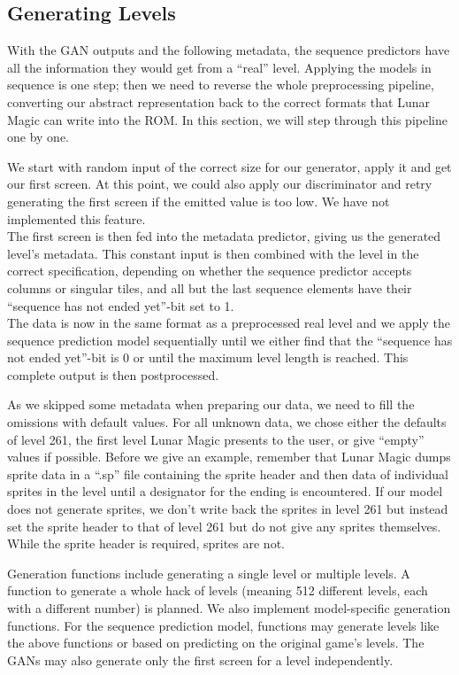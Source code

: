 \subsection{Generating Levels}
\label{sec:generating-levels}

With the GAN outputs and the following metadata, the sequence
predictors have all the information they would get from a ``real''
level. Applying the models in sequence is one step; then we need to
reverse the whole preprocessing pipeline, converting our abstract
representation back to the correct formats that Lunar Magic can write
into the ROM. In this section, we will step through this pipeline one
by one.

We start with random input of the correct size for our generator,
apply it and get our first screen. At this point, we could also apply
our discriminator and retry generating the first screen if the emitted
value is too low. We have not implemented this feature. \\
The first screen is then fed into the metadata predictor, giving us
the generated level's metadata. This constant input is then combined
with the level in the correct specification, depending on whether the
sequence predictor accepts columns or singular tiles, and all but the
last sequence elements have their ``sequence has not ended yet''-bit
set to 1. \\
The data is now in the same format as a preprocessed real level and we
apply the sequence prediction model sequentially until we either find
that the ``sequence has not ended yet''-bit is 0 or until the maximum
level length is reached. This complete output is then postprocessed.

As we skipped some metadata when preparing our data, we need to fill
the omissions with default values. For all unknown data, we chose
either the defaults of level 261, the first level Lunar Magic presents
to the user, or give ``empty'' values if possible. Before we give an
example, remember that Lunar Magic dumps sprite data in a ``.sp'' file
containing the sprite header and then data of individual sprites in
the level until a designator for the ending is encountered. If our
model does not generate sprites, we don't write back the sprites in
level 261 but instead set the sprite header to that of level 261 but
do not give any sprites themselves. While the sprite header is
required, sprites are not.

Generation functions include generating a single level or multiple
levels. A function to generate a whole hack of levels (meaning 512
different levels, each with a different number) is planned. We also
implement model-specific generation functions. For the sequence
prediction model, functions may generate levels like the above
functions or based on predicting on the original game's levels. The
GANs may also generate only the first screen for a level
independently.

